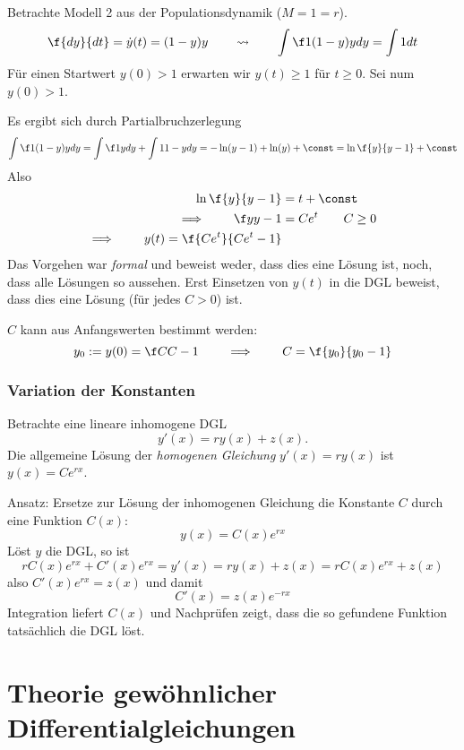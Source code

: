 \documentclass[
]{mycourse}
\begin{document}
\begin{ex} \label{1.3}
	Betrachte Modell 2 aus der Populationsdynamik ($M=1=r$).
	\begin{align*}
		\f {dy}{dt} = \dot y(t) = (1-y)y
		\qquad \leadsto \qquad
		\int \f 1{(1-y)y} dy = \int 1 dt
	\end{align*}
	Für einen Startwert $y(0) > 1$ erwarten wir $y(t) \ge 1$ für $t \ge 0$.
	Sei num $y(0) > 1$.

	Es ergibt sich durch Partialbruchzerlegung
	\begin{align*}
		\int \f 1{(1-y)y} dy 
		= \int \f 1y dy + \int 1{1-y} dy
		= - \ln (y-1) + \ln(y) + \const
		= \ln \f {y}{y-1} + \const
	\end{align*}
	Also 
	\begin{align*}
		\ln \f {y}{y-1} &= t + \const \\
		\implies \qquad	\f y{y-1} &= C e^t \qquad C \ge 0 \\
		\implies \qquad y(t)= \f {Ce^t}{Ce^t - 1}
	\end{align*}
	Das Vorgehen war \emph{formal} und beweist weder, dass dies eine Lösung ist, noch, dass alle Lösungen so aussehen.
	Erst Einsetzen von $y(t)$ in die DGL beweist, dass dies eine Lösung (für jedes $C>0$) ist.

	$C$ kann aus Anfangswerten bestimmt werden:
	\[
		y_0 := y(0) = \f C{C-1}
		\qquad \implies \qquad
		C = \f {y_0}{y_0-1}
	\]
\end{ex}

\subsubsection{Variation der Konstanten}

Betrachte eine lineare inhomogene DGL
\[
	y'(x) = ry(x) + z(x).
\]
Die allgemeine Lösung der \emph{homogenen Gleichung} $y'(x) = ry(x)$ ist $y(x) = Ce^{rx}$.

Ansatz: Ersetze zur Lösung der inhomogenen Gleichung die Konstante $C$ durch eine Funktion $C(x)$:
\[
	y(x) = C(x) e^{rx}
\]
Löst $y$ die DGL, so ist
\[
	rC(x)e^{rx} + C'(x)e^{rx} = y'(x) = ry(x) + z(x) = rC(x)e^{rx} + z(x)
\]
also $C'(x) e^{rx} = z(x)$ und damit
\[
	C'(x) = z(x) e^{-rx}
\]
Integration liefert $C(x)$ und Nachprüfen zeigt, dass die so gefundene Funktion tatsächlich die DGL löst.



\section{Theorie gewöhnlicher Differentialgleichungen}
\end{document}

